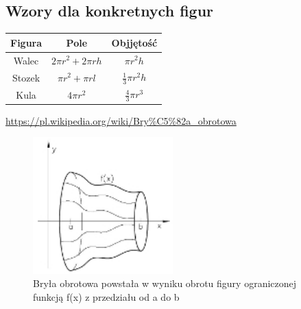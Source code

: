 \documentclass{article}
\begin{document}
	\subsection{Wzory dla konkretnych figur}	
	\begin{tabular}{|c|c|c|}
 	\hline 
 	Figura & Pole & Objjętość \\
 	\hline
 	Walec & $2\pi r^{2} + 2\pi rh$ & $\pi r^{2}h$  \\
	\hline
 	Stozek & $\pi r^{2} + \pi rl$ & $\frac{1}{3}\pi r^{2}h$  \\
  	\hline
  	Kula & $4\pi r^{2}$ & $\frac{4}{3}\pi r^{3}$  \\
  	\hline
	\end{tabular} 
	\begin{thebibliography}{99}
	 \url{https://pl.wikipedia.org/wiki/Bry%C5%82a_obrotowa}
	\end{thebibliography}
	
	\begin{figure}
	\vspace{-20pt}
	\includegraphics[width=0.48\textwidth]{k}
	\vspace{-20pt}
	\caption{Bryła obrotowa powstała w wyniku obrotu figury ograniczonej funkcją f(x) z przedziału od a do b}
	\vspace{-10pt}
	\end{figure}
\end{document}
